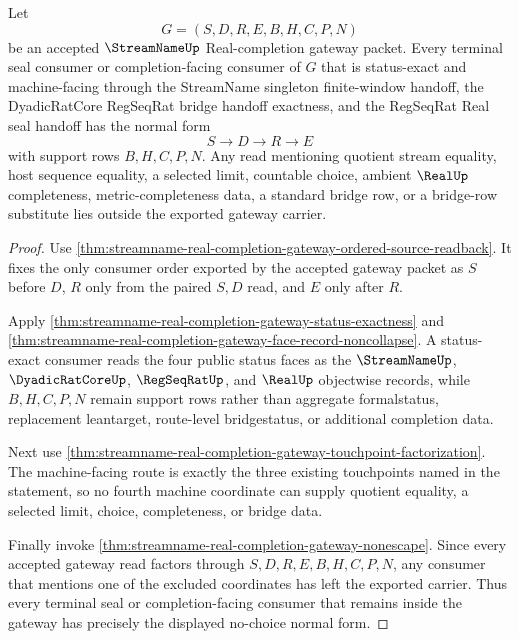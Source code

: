 \begin{theorem}
\label{thm:streamname-real-completion-gateway-no-choice-normal-form}
Let
$$
G=(S,D,R,E,B,H,C,P,N)
$$
be an accepted $\StreamNameUp$ Real-completion gateway packet. Every terminal seal consumer or completion-facing consumer of $G$ that is status-exact and machine-facing through the StreamName singleton finite-window handoff, the DyadicRatCore RegSeqRat bridge handoff exactness, and the RegSeqRat Real seal handoff has the normal form
$$
S \longrightarrow D \longrightarrow R \longrightarrow E
$$
with support rows $B,H,C,P,N$. Any read mentioning quotient stream equality, host sequence equality, a selected limit, countable choice, ambient $\RealUp$ completeness, metric-completeness data, a standard bridge row, or a bridge-row substitute lies outside the exported gateway carrier.
\end{theorem}
\begin{proof}
Use \autoref{thm:streamname-real-completion-gateway-ordered-source-readback}. It fixes the only consumer order exported by the accepted gateway packet as $S$ before $D$, $R$ only from the paired $S,D$ read, and $E$ only after $R$.

Apply \autoref{thm:streamname-real-completion-gateway-status-exactness} and \autoref{thm:streamname-real-completion-gateway-face-record-noncollapse}. A status-exact consumer reads the four public status faces as the $\StreamNameUp$, $\DyadicRatCoreUp$, $\RegSeqRatUp$, and $\RealUp$ objectwise records, while $B,H,C,P,N$ remain support rows rather than aggregate formalstatus, replacement leantarget, route-level bridgestatus, or additional completion data.

Next use \autoref{thm:streamname-real-completion-gateway-touchpoint-factorization}. The machine-facing route is exactly the three existing touchpoints named in the statement, so no fourth machine coordinate can supply quotient equality, a selected limit, choice, completeness, or bridge data.

Finally invoke \autoref{thm:streamname-real-completion-gateway-nonescape}. Since every accepted gateway read factors through $S,D,R,E,B,H,C,P,N$, any consumer that mentions one of the excluded coordinates has left the exported carrier. Thus every terminal seal or completion-facing consumer that remains inside the gateway has precisely the displayed no-choice normal form.
\end{proof}

